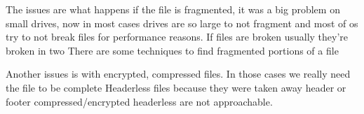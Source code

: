             The issues are what happens if the file is fragmented, it was a big problem on small drives, now in most cases drives are so large to not fragment 
            and most of os try to not break files for performance reasons.
            If files are broken usually they're broken in two 
            There are some techniques to find fragmented portions of a file 

            Another issues is with encrypted, compressed files. In those cases we really need the file to be complete 
            Headerless files because they were taken away header or footer
            compressed/encrypted headerless are not approachable.
            


    
